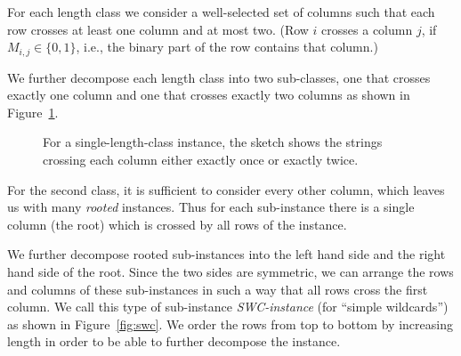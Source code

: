 For each length class we consider a well-selected set of columns such that each row crosses at least one column and at most two.
(Row $i$ crosses a column $j$, if $M_{i,j} \in \{0,1\}$, i.e., the binary part of the row contains that column.)

We further decompose each length class into two sub-classes, one that crosses exactly one column and one that crosses exactly two columns as shown in Figure~\ref{fig:gen_instance1}.

\begin{figure}[h]
    \begin{center}
        \caption{\label{fig:gen_instance1} For a single-length-class instance, the sketch shows the strings crossing each column either exactly once or exactly twice.}
    \end{center}
\end{figure}
For the second class, it is sufficient to consider every other column, which leaves us with many \emph{rooted} instances.
Thus for each sub-instance there is a single column (the root) which is crossed by all rows of the instance.

We further decompose rooted sub-instances into the left hand side and the right hand side of the root.
Since the two sides are symmetric, we can arrange the rows and columns of these sub-instances in such a way that all rows cross the first column.
We call this type of sub-instance \emph{SWC-instance} (for ``simple wildcards'') as shown in Figure~\ref{fig:swc}.
We order the rows from top to bottom by increasing length in order to be able to further decompose the instance.

